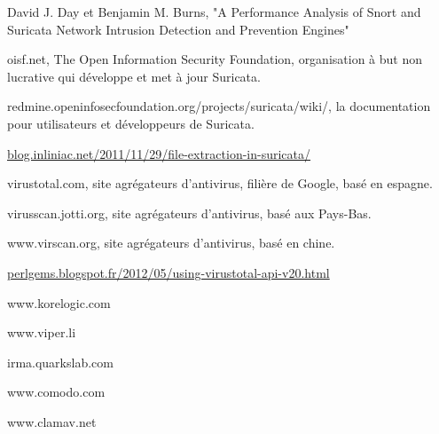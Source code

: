 \documentclass[smallextended]{svjour3}       %
\begin{document}
\newpage
\begin{thebibliography}{}
%

David J. Day et Benjamin M. Burns, "A Performance Analysis of Snort and Suricata Network Intrusion Detection and Prevention Engines"

oisf.net, The Open Information Security Foundation, organisation à but non lucrative qui développe et met à jour Suricata.

redmine.openinfosecfoundation.org/projects/suricata/wiki/, la documentation pour utilisateurs et développeurs de Suricata.

\url{blog.inliniac.net/2011/11/29/file-extraction-in-suricata/}

virustotal.com, site agrégateurs d'antivirus, filière de Google, basé en espagne.

virusscan.jotti.org, site agrégateurs d'antivirus, basé aux Pays-Bas.

www.virscan.org, site agrégateurs d'antivirus, basé en chine.

\url{perlgems.blogspot.fr/2012/05/using-virustotal-api-v20.html}

www.korelogic.com

www.viper.li

irma.quarkslab.com

www.comodo.com

www.clamav.net

%

\end{thebibliography}
\end{document}
